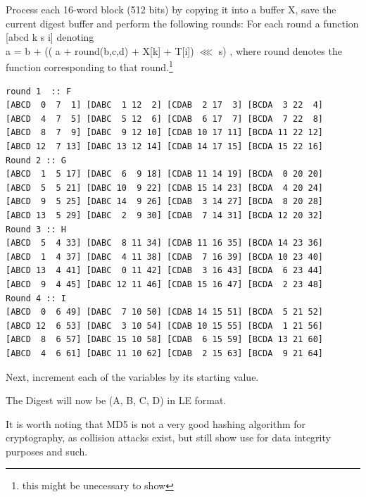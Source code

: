 \documentclass[a4paper]{article}
\begin{document}
Process each 16-word block (512 bits) by copying it into a buffer X,
save the current digest buffer and perform the following rounds:
For each round a function [abcd k s i] denoting\\
a = b + (( a + round(b,c,d) + X[k] + T[i]) \(\lll\) s)
, where round denotes the function corresponding to that round.\footnote{this might be unecessary to show}
\begin{verbatim}
round 1  :: F
[ABCD  0  7  1] [DABC  1 12  2] [CDAB  2 17  3] [BCDA  3 22  4]
[ABCD  4  7  5] [DABC  5 12  6] [CDAB  6 17  7] [BCDA  7 22  8]
[ABCD  8  7  9] [DABC  9 12 10] [CDAB 10 17 11] [BCDA 11 22 12]
[ABCD 12  7 13] [DABC 13 12 14] [CDAB 14 17 15] [BCDA 15 22 16]
Round 2 :: G
[ABCD  1  5 17] [DABC  6  9 18] [CDAB 11 14 19] [BCDA  0 20 20]
[ABCD  5  5 21] [DABC 10  9 22] [CDAB 15 14 23] [BCDA  4 20 24]
[ABCD  9  5 25] [DABC 14  9 26] [CDAB  3 14 27] [BCDA  8 20 28]
[ABCD 13  5 29] [DABC  2  9 30] [CDAB  7 14 31] [BCDA 12 20 32]
Round 3 :: H
[ABCD  5  4 33] [DABC  8 11 34] [CDAB 11 16 35] [BCDA 14 23 36]
[ABCD  1  4 37] [DABC  4 11 38] [CDAB  7 16 39] [BCDA 10 23 40]
[ABCD 13  4 41] [DABC  0 11 42] [CDAB  3 16 43] [BCDA  6 23 44]
[ABCD  9  4 45] [DABC 12 11 46] [CDAB 15 16 47] [BCDA  2 23 48]
Round 4 :: I
[ABCD  0  6 49] [DABC  7 10 50] [CDAB 14 15 51] [BCDA  5 21 52]
[ABCD 12  6 53] [DABC  3 10 54] [CDAB 10 15 55] [BCDA  1 21 56]
[ABCD  8  6 57] [DABC 15 10 58] [CDAB  6 15 59] [BCDA 13 21 60]
[ABCD  4  6 61] [DABC 11 10 62] [CDAB  2 15 63] [BCDA  9 21 64]
\end{verbatim}
Next, increment each of the variables by its starting value.

The Digest will now be (A, B, C, D) in LE format.

It is worth noting that MD5 is not a very good hashing algorithm for cryptography, as collision attacks exist, but still show use for data integrity purposes and such.
\end{document}
